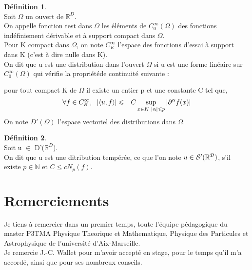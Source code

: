 \documentclass[a4paper,11pt]{article}
\theoremstyle{plain}
\theoremstyle{definition}
\newtheorem{dfn}{Définition}[section]
\theoremstyle{remark}
\numberwithin{equation}{section}
\numberwithin{equation}{subsection}
\numberwithin{figure}{section}
\begin{document}
\begin{dfn} $\left. \right. $\\
 Soit $\Omega$ un ouvert de $\mathbb{R}^{D}$.\\
On appelle fonction test dans $\Omega$ les éléments de $C_{0}^{\infty}(\Omega)$ des fonctions indéfiniement dérivable et à 
support compact dans $\Omega$.\\
Pour K compact dans $\Omega$, on note $C^{\infty}_{K}$ l'espace des fonctions d'essai à support dans K (c'est à dire nulle dans K). \\
On dit que u est une distribution dans l'ouvert $\Omega$ si u est une forme linéaire sur $C^{\infty}_{0}(\Omega)$ qui vérifie 
la propriétéde continuité suivante :

pour tout compact K de $\Omega$ il existe un entier p et une constante C tel que,
\begin{eqnarray}
 \forall f \in C^{\infty}_{K}, \hspace{2mm} 
\left| \langle u,f \rangle \right|  &\leqslant&  C  \sup_{x \in K  \hspace{1mm} |\alpha| \leqslant p} \left| \partial^{\alpha} f(x) \right|
\end{eqnarray}
On note $D'(\Omega)$ l'espace vectoriel des distributions dans $\Omega$.
\end{dfn}
\begin{dfn} $\left. \right. $\\
 Soit u $\in$ D'($\mathbb{R}^{D}$).\\
 On dit que u est une ditribution tempérée, ce que l'on note $u \in \cal{S}'(\mathbb{R}^{D})$, s'il existe 
$p \in \mathbb{N}$ et $C \leqslant c N_{p}(f)$.
\end{dfn}

\section{Remerciements}

Je tiens à remercier dans un premier temps, toute l’équipe pédagogique du master P3TMA Physique Theorique et Mathematique, Physique des 
Particules et Astrophysique de l'université d'Aix-Marseille.  \\

Je remercie J.-C. Wallet pour m'avoir accepté en stage, pour le temps qu'il m'a accordé, ainsi que pour ses nombreux conseils.\\
\end{document}

